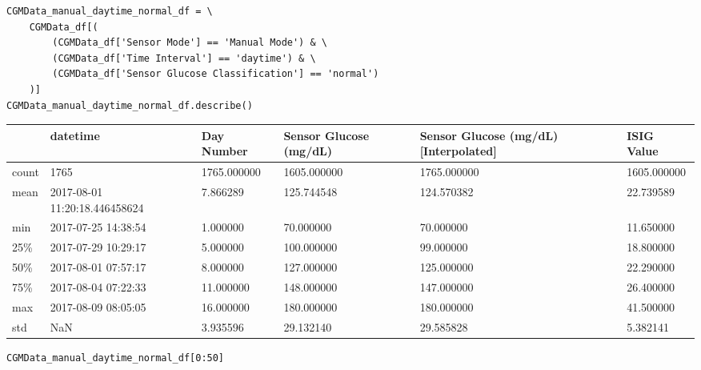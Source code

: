 \begin{verbatim}
CGMData_manual_daytime_normal_df = \
    CGMData_df[(
        (CGMData_df['Sensor Mode'] == 'Manual Mode') & \
        (CGMData_df['Time Interval'] == 'daytime') & \
        (CGMData_df['Sensor Glucose Classification'] == 'normal')
    )]
CGMData_manual_daytime_normal_df.describe()
\end{verbatim}

\bigskip\noindent
\begin{tabular}{p{}p{}p{}p{}p{}p{}}
\toprule
 & datetime & Day Number & Sensor Glucose (mg/dL) & Sensor Glucose (mg/dL) [Interpolated] & ISIG Value \\
\hline
count & 1765 & 1765.000000 & 1605.000000 & 1765.000000 & 1605.000000 \\
\hline
mean & 2017-08-01 11:20:18.446458624 & 7.866289 & 125.744548 & 124.570382 & 22.739589 \\
\hline
min & 2017-07-25 14:38:54 & 1.000000 & 70.000000 & 70.000000 & 11.650000 \\
\hline
25\% & 2017-07-29 10:29:17 & 5.000000 & 100.000000 & 99.000000 & 18.800000 \\
\hline
50\% & 2017-08-01 07:57:17 & 8.000000 & 127.000000 & 125.000000 & 22.290000 \\
\hline
75\% & 2017-08-04 07:22:33 & 11.000000 & 148.000000 & 147.000000 & 26.400000 \\
\hline
max & 2017-08-09 08:05:05 & 16.000000 & 180.000000 & 180.000000 & 41.500000 \\
\hline
std & NaN & 3.935596 & 29.132140 & 29.585828 & 5.382141 \\
\hline
\bottomrule
\end{tabular}

\bigskip

\begin{verbatim}
CGMData_manual_daytime_normal_df[0:50]
\end{verbatim}

